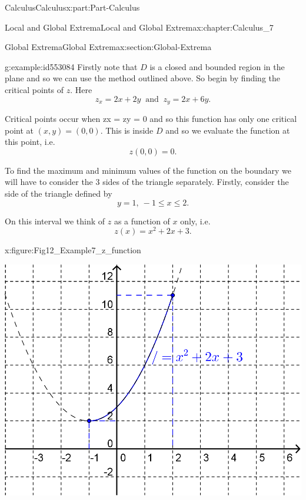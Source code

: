 \documentclass[oneside,10pt,]{book}
\numberwithin{equation}{section}
\begin{document}
\begin{partptx}{Calculus}{}{Calculus}{}{}{x:part:Part-Calculus}
\begin{chapterptx}{Local and Global Extrema}{}{Local and Global Extrema}{}{}{x:chapter:Calculus_7}
\begin{sectionptx}{Global Extrema}{}{Global Extrema}{}{}{x:section:Global-Extrema}
\begin{example}{}{g:example:id553084}
Firstly note that \(D\) is a closed and bounded region in the plane and so we can use the method outlined above. So begin by finding the critical points of \(z\). Here%
\begin{equation*}
z_x = 2x+2y \: \text{ and } \: z_y = 2x+6y\text{.}
\end{equation*}
%
\par
Critical points occur when z\textunderscore{}x = z\textunderscore{}y = 0 and so this function has only one critical point at \((x,y) = (0,0)\). This is inside \(D\) and so we evaluate the function at this point, i.e.%
\begin{equation*}
z(0,0) = 0\text{.}
\end{equation*}
%
\par
To find the maximum and minimum values of the function on the boundary we will have to consider the 3 sides of the triangle separately. Firstly, consider the side of the triangle defined by%
\begin{equation*}
y=1, \: -1 \leq x \leq 2\text{.}
\end{equation*}
%
\par
On this interval we think of \(z\) as a function of \(x\) only, i.e.%
\begin{equation*}
z(x) = x^2 + 2x + 3\text{.}
\end{equation*}
%
\begin{figureptx}{}{x:figure:Fig12_Example7_z_function}{}%
\begin{image}{0.2}{0.6}{0.2}%
\includegraphics[width=\linewidth]{./Calculus/Images/7/Fig12_Example7_z_function.png}
\end{image}%

\end{figureptx}
\end{example}
\end{sectionptx}
\end{chapterptx}
\end{partptx}
\end{document}
